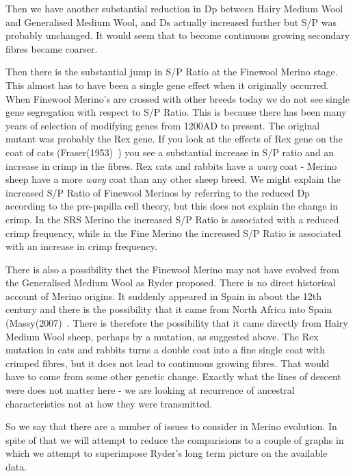 \documentclass[titlepage]{article}  %
\begin{document}
Then we have another substantial reduction in Dp between Hairy Medium Wool and Generalised Medium Wool, and Ds actually increased further but S/P was probably unchanged. It would seem that to become continuous growing secondary fibres became coarser. 

Then there is the substantial jump in S/P Ratio at the Finewool Merino stage. This almost has to have been a single gene effect when it originally occurred. When Finewool Merino's are crossed with other breeds today we do not see single gene segregation with respect to S/P Ratio. This is because there has been many years of selection of modifying genes from 1200AD to present. The original mutant was probably the Rex gene. If you look at the effects of Rex gene on the coat of cats (Fraser(1953)~\cite{fras:53}) you see a substantial increase in S/P ratio and an increase in crimp in the fibres. Rex cats and rabbits have a {\em wavy} coat - Merino sheep have a more {\em wavy} coat than any other sheep breed. We might explain the increased S/P Ratio of Finewool Merinos by referring to the reduced Dp according to the pre-papilla cell theory, but this does not explain the change in crimp. In the SRS Merino the increased S/P Ratio is associated with a reduced crimp frequency, while in the Fine Merino the increased S/P Ratio is associated with an increase in crimp frequency. 

There is also a possibility thet the Finewool Merino may not have evolved from  the Generalised Medium Wool as Ryder proposed. There is no direct historical account of Merino origins. It suddenly appeared in Spain in about the 12th century and there is the possibility that it came from North Africa into Spain (Massy(2007)~\cite{mass:07}. There is therefore the possibility that it came directly from Hairy Medium Wool sheep, perhaps by a mutation, as suggested above. The Rex mutation in cats and rabbits turns a double coat into a fine single coat with crimped fibres, but it does not lead to continuous growing fibres. That would have to come from some other genetic change. Exactly what the lines of descent were does not matter here - we are looking at recurrence of ancestral characteristics not at how they were transmitted.

So we say that there are a number of issues to consider in Merino evolution. In spite of that we will attempt to reduce the comparisions to a couple of graphs in which we attempt to superimpose Ryder's long term picture on the available data. 
\end{document}
